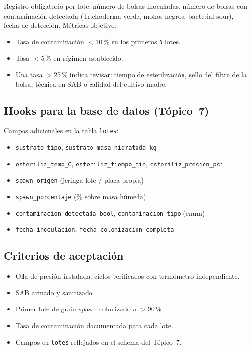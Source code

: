Registro obligatorio por lote: número de bolsas inoculadas, número de
bolsas con contaminación detectada (Trichoderma verde, mohos negros,
bacterial sour), fecha de detección. Métricas objetivo:

\begin{itemize}[leftmargin=*,itemsep=0pt]
  \item Tasa de contaminación $<$10\,\% en los primeros 5 lotes.
  \item Tasa $<$5\,\% en régimen establecido.
  \item Una tasa $>$25\,\% indica revisar: tiempo de esterilización,
        sello del filtro de la bolsa, técnica en SAB o calidad del
        cultivo madre.
\end{itemize}

\subsection{Hooks para la base de datos (Tópico~7)}
\label{sec:preparacion:hooks}

Campos adicionales en la tabla \texttt{lotes}:

\begin{itemize}[leftmargin=*,itemsep=0pt]
  \item \texttt{sustrato\_tipo}, \texttt{sustrato\_masa\_hidratada\_kg}
  \item \texttt{esteriliz\_temp\_C}, \texttt{esteriliz\_tiempo\_min},
        \texttt{esteriliz\_presion\_psi}
  \item \texttt{spawn\_origen} (jeringa lote / placa propia)
  \item \texttt{spawn\_porcentaje} (\% sobre masa húmeda)
  \item \texttt{contaminacion\_detectada\_bool},
        \texttt{contaminacion\_tipo} (enum)
  \item \texttt{fecha\_inoculacion}, \texttt{fecha\_colonizacion\_completa}
\end{itemize}

\subsection{Criterios de aceptación}
\label{sec:preparacion:aceptacion}

\begin{itemize}[leftmargin=*,itemsep=0pt]
  \item Olla de presión instalada, ciclos verificados con termómetro
        independiente.
  \item SAB armado y sanitizado.
  \item Primer lote de grain spawn colonizado a $>$90\,\%.
  \item Tasa de contaminación documentada para cada lote.
  \item Campos en \texttt{lotes} reflejados en el schema del Tópico~7.
\end{itemize}
